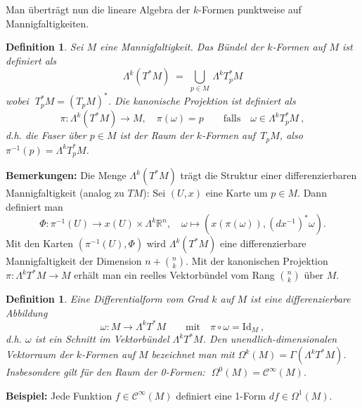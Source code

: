 \documentclass[12pt,a4paper]{article}
\def\R{\mathbb{R}}
\def\Id{\mathrm{Id}}
\newtheorem{Definition}[Lemma]{Definition}
\begin{document}
\bigskip

Man \"ubertr\"agt nun die lineare Algebra der $k$-Formen punktweise auf Mannigfaltigkeiten.

\begin{Definition}
Sei $M$ eine Mannigfaltigkeit. Das B\"undel der $k$-Formen auf $M$ ist definiert als
$$
\Lambda^k (T^*M) \;=\; \bigcup_{p\in M} \, \Lambda^k T^*_p M
$$
wobei $\;T^*_p M = (T_pM)^*$. Die kanonische Projektion ist definiert als
$$
\pi : \Lambda^k (T^*M) \rightarrow M, \quad \pi(\omega) = p \qquad \mbox{falls}\quad \omega \in \Lambda^k T^*_pM \ ,
$$
d.h. die Faser \"uber $p \in M$ ist der Raum der $k$-Formen auf $\,T_pM$, also $\pi^{-1}(p) = \Lambda^k T^*_pM$.
\end{Definition}

\bigskip

{\bf Bemerkungen:}
Die Menge $\Lambda^k (T^*M)$ tr\"agt die Struktur einer differenzierbaren Mannigfaltigkeit (analog zu $TM$):
Sei $(U,x)$ eine Karte um $p\in M$. Dann definiert man
$$
\Phi: \pi^{-1}(U) \rightarrow x(U) \times \Lambda^k \R^n, \quad \omega \mapsto (x(\pi(\omega)),(dx^{-1})^*\omega) .
$$
Mit den Karten $(\pi^{-1}(U), \Phi)$ wird $\Lambda^k (T^*M)$ eine differenzierbare Mannigfaltigkeit der
Dimension $n + {n \choose k}$. Mit der kanonischen Projektion $\pi : \Lambda^k T^*M\rightarrow M$ erh\"alt man
ein reelles Vektorb\"undel vom Rang ${n \choose k}$ \"uber $M$.

\bigskip

\begin{Definition}
Eine Differentialform vom Grad $k$ auf $M$ ist eine differenzierbare Abbildung
$$
\omega : M \longrightarrow \Lambda^k T^*M \qquad \mbox{mit} \quad \pi \circ \omega = \Id_M \ ,
$$
d.h. $\omega$ ist ein Schnitt im Vektorb\"undel $\Lambda^k T^*M$. Den unendlich-dimensionalen
Vektorraum der $k$-Formen auf $M$ bezeichnet man mit $\Omega^k(M) = \Gamma(\Lambda^k T^*M)$.
Insbesondere gilt f\"ur den Raum der 0-Formen: $\;\Omega^0(M) = \mathcal C^\infty(M)$.
\end{Definition}

\bigskip

{\bf Beispiel:} Jede Funktion $f \in \mathcal C^\infty(M)$ definiert eine 1-Form $df \in \Omega^1(M)$.

\bigskip

\end{document}
